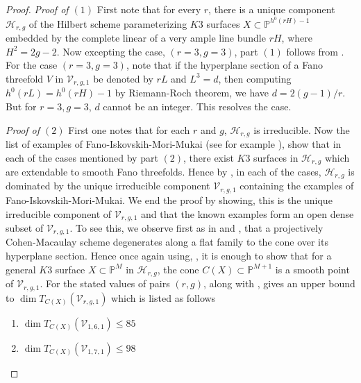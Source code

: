 \documentclass[11pt,twoside]{amsart}
\theoremstyle{plain}
\numberwithin{equation}{section}
\theoremstyle{definition}
\begin{document}
\begin{proof}
  \noindent\textit{Proof of $(1)$} First note that for every $r$, there is a unique component $\mathcal{H}_{r,g}$ of the Hilbert scheme parameterizing $K3$ surfaces $X \subset \mathbb{P}^{h^0(rH)-1}$ embedded by the complete linear of a very ample line bundle $rH$, where $H^2 = 2g-2$. Now excepting the case, $(r = 3, g = 3)$, part $(1)$ follows from . For the case $(r=3, g=3)$, note that if the hyperplane section of a Fano threefold $V$ in $\mathcal{V}_{r,g,1}$ be denoted by $rL$ and $L^3 = d$, then computing $h^0(rL) = h^0(rH)-1$ by Riemann-Roch theorem, we have $d = 2(g-1)/r$. But for $r = 3, g = 3$, $d$ cannot be an integer. This resolves the case. \par
  \textit{Proof of $(2)$} First one notes that for each $r$ and $g$, $\mathcal{H}_{r,g}$ is irreducible. Now the list of examples of Fano-Iskovskih-Mori-Mukai (see for example \cite[Table $3.1$]{CLM98}), show that in each of the cases mentioned by part $(2)$, there exist $K3$ surfaces in $\mathcal{H}_{r,g}$ which are extendable to smooth Fano threefolds. Hence by , in each of the cases, $\mathcal{H}_{r,g}$ is dominated by the unique irreducible component $\mathcal{V}_{r,g,1}$ containing the examples of Fano-Iskovskih-Mori-Mukai. We end the proof by showing, this is the unique irreducible component of $\mathcal{V}_{r,g,1}$ and that the known examples form an open dense subset of $\mathcal{V}_{r,g,1}$.  To see this, we observe first as in \cite{CLM93} and \cite{CLM98}, that a projectively Cohen-Macaulay scheme degenerates along a flat family to the cone over its hyperplane section. Hence once again using, , it is enough to show that for a general $K3$ surface $X \subset \mathbb{P}^{M}$ in $\mathcal{H}_{r,g}$, the cone $C(X) \subset \mathbb{P}^{M+1}$ is a smooth point of $\mathcal{V}_{r,g,1}$. For the stated values of pairs $(r,g)$, 
   along with , gives an upper bound to $\operatorname{dim}T_{C(X)}(\mathcal{V}_{r,g,1})$ which is listed as follows 
  \begin{enumerate}
      \item $\operatorname{dim}T_{C(X)}(\mathcal{V}_{1,6,1}) \leq 85$

      \item $\operatorname{dim}T_{C(X)}(\mathcal{V}_{1,7,1}) \leq 98$


\end{enumerate}
\end{proof}
\end{document}

